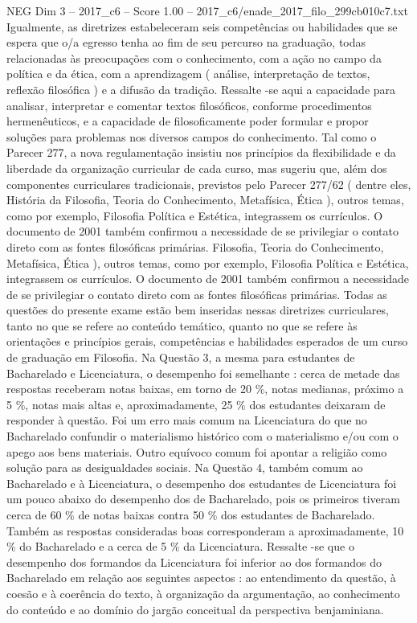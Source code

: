 \begin{textsample}{NEG Dim 3 – 2017\_c6 – Score 1.00 – 2017\_c6/enade\_2017\_filo\_299cb010c7.txt}
Igualmente, as diretrizes estabeleceram seis competências ou habilidades que se espera que o/a egresso tenha ao fim de seu percurso na graduação, todas relacionadas às preocupações com o conhecimento, com a ação no campo da política e da ética, com a aprendizagem ( análise, interpretação de textos, reflexão filosófica ) e a difusão da tradição.
Ressalte -se aqui a capacidade para analisar, interpretar e comentar textos filosóficos, conforme procedimentos hermenêuticos, e a capacidade de filosoficamente poder formular e propor soluções para problemas nos diversos campos do conhecimento.
Tal como o Parecer 277, a nova regulamentação insistiu nos princípios da flexibilidade e da liberdade da organização curricular de cada curso, mas sugeriu que, além dos componentes curriculares tradicionais, previstos pelo Parecer 277/62 ( dentre eles, História da Filosofia, Teoria do Conhecimento, Metafísica, Ética ), outros temas, como por exemplo, Filosofia Política e Estética, integrassem os currículos.
O documento de 2001 também confirmou a necessidade de se privilegiar o contato direto com as fontes filosóficas primárias.
Filosofia, Teoria do Conhecimento, Metafísica, Ética ), outros temas, como por exemplo, Filosofia Política e Estética, integrassem os currículos.
O documento de 2001 também confirmou a necessidade de se privilegiar o contato direto com as fontes filosóficas primárias.
Todas as questões do presente exame estão bem inseridas nessas diretrizes curriculares, tanto no que se refere ao conteúdo temático, quanto no que se refere às orientações e princípios gerais, competências e habilidades esperados de um curso de graduação em Filosofia.
Na Questão 3, a mesma para estudantes de Bacharelado e Licenciatura, o desempenho foi semelhante : cerca de metade das respostas receberam notas baixas, em torno de 20 \%, notas medianas, próximo a 5 \%, notas mais altas e, aproximadamente, 25 \% dos estudantes deixaram de responder à questão.
Foi um erro mais comum na Licenciatura do que no Bacharelado confundir o materialismo histórico com o materialismo e/ou com o apego aos bens materiais.
Outro equívoco comum foi apontar a religião como solução para as desigualdades sociais.
Na Questão 4, também comum ao Bacharelado e à Licenciatura, o desempenho dos estudantes de Licenciatura foi um pouco abaixo do desempenho dos de Bacharelado, pois os primeiros tiveram cerca de 60 \% de notas baixas contra 50 \% dos estudantes de Bacharelado.
Também as respostas consideradas boas corresponderam a aproximadamente, 10 \% do Bacharelado e a cerca de 5 \% da Licenciatura.
Ressalte -se que o desempenho dos formandos da Licenciatura foi inferior ao dos formandos do Bacharelado em relação aos seguintes aspectos : ao entendimento da questão, à coesão e à coerência do texto, à organização da argumentação, ao conhecimento do conteúdo e ao domínio do jargão conceitual da perspectiva benjaminiana.

\end{textsample}
